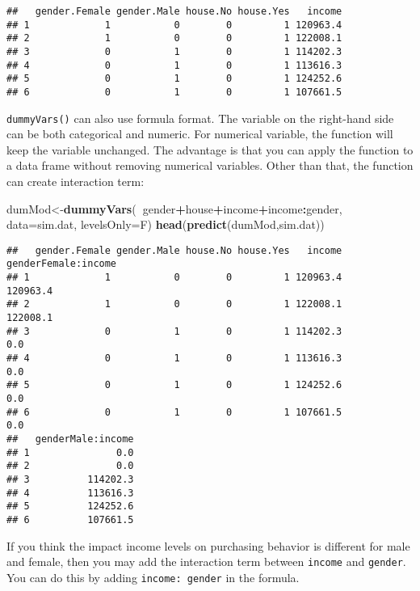 \documentclass[
]{article}
\newenvironment{Shaded}{\begin{snugshade}}{\end{snugshade}}
\newcommand{\DataTypeTok}[1]{\textcolor[rgb]{0.13,0.29,0.53}{#1}}
\newcommand{\KeywordTok}[1]{\textcolor[rgb]{0.13,0.29,0.53}{\textbf{#1}}}
\newcommand{\NormalTok}[1]{#1}
\newcommand{\OperatorTok}[1]{\textcolor[rgb]{0.81,0.36,0.00}{\textbf{#1}}}
\begin{document}
\begin{verbatim}
##   gender.Female gender.Male house.No house.Yes   income
## 1             1           0        0         1 120963.4
## 2             1           0        0         1 122008.1
## 3             0           1        0         1 114202.3
## 4             0           1        0         1 113616.3
## 5             0           1        0         1 124252.6
## 6             0           1        0         1 107661.5
\end{verbatim}

\texttt{dummyVars()} can also use formula format. The variable on the
right-hand side can be both categorical and numeric. For numerical
variable, the function will keep the variable unchanged. The advantage
is that you can apply the function to a data frame without removing
numerical variables. Other than that, the function can create
interaction term:

\begin{Shaded}
\begin{Highlighting}[]
\NormalTok{dumMod<-}\KeywordTok{dummyVars}\NormalTok{(}\OperatorTok{~}\NormalTok{gender}\OperatorTok{+}\NormalTok{house}\OperatorTok{+}\NormalTok{income}\OperatorTok{+}\NormalTok{income}\OperatorTok{:}\NormalTok{gender,}
                  \DataTypeTok{data=}\NormalTok{sim.dat,}
                  \DataTypeTok{levelsOnly=}\NormalTok{F)}
\KeywordTok{head}\NormalTok{(}\KeywordTok{predict}\NormalTok{(dumMod,sim.dat))}
\end{Highlighting}
\end{Shaded}

\begin{verbatim}
##   gender.Female gender.Male house.No house.Yes   income genderFemale:income
## 1             1           0        0         1 120963.4            120963.4
## 2             1           0        0         1 122008.1            122008.1
## 3             0           1        0         1 114202.3                 0.0
## 4             0           1        0         1 113616.3                 0.0
## 5             0           1        0         1 124252.6                 0.0
## 6             0           1        0         1 107661.5                 0.0
##   genderMale:income
## 1               0.0
## 2               0.0
## 3          114202.3
## 4          113616.3
## 5          124252.6
## 6          107661.5
\end{verbatim}

If you think the impact income levels on purchasing behavior is
different for male and female, then you may add the interaction term
between \texttt{income} and \texttt{gender}. You can do this by adding
\texttt{income:\ gender} in the formula.
\end{document}
